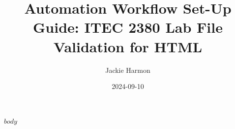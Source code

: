\documentclass[11pt]{article}
\title{Automation Workflow Set-Up Guide: ITEC 2380 Lab File Validation for HTML}
\author{Jackie Harmon}
\date{2024-09-10}
\begin{document}
\maketitle
\newpage %

\tableofcontents
\newpage %

\providecommand{\tightlist}{%
  \setlength{\itemsep}{0pt}\setlength{\parskip}{0pt}}

\let\Oldincludegraphics\includegraphics
\renewcommand{\includegraphics}[2][]{%
  \noindent\begin{flushleft} %
    \Oldincludegraphics[#1]{#2}%
  \end{flushleft}
}

$body$
\end{document}

